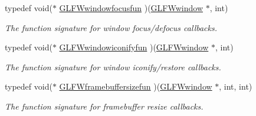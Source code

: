\begin{DoxyCompactItemize}
typedef void($\ast$ \hyperlink{group__window_ga6b5f973531ea91663ad707ba4f2ac104}{\-G\-L\-F\-Wwindowfocusfun} )(\hyperlink{group__window_ga3c96d80d363e67d13a41b5d1821f3242}{\-G\-L\-F\-Wwindow} $\ast$, int)
\begin{DoxyCompactList}\small\item\em \-The function signature for window focus/defocus callbacks. \end{DoxyCompactList}\item 
typedef void($\ast$ \hyperlink{group__window_gae47ae066eea9fe6050a62360928ae524}{\-G\-L\-F\-Wwindowiconifyfun} )(\hyperlink{group__window_ga3c96d80d363e67d13a41b5d1821f3242}{\-G\-L\-F\-Wwindow} $\ast$, int)
\begin{DoxyCompactList}\small\item\em \-The function signature for window iconify/restore callbacks. \end{DoxyCompactList}\item 
typedef void($\ast$ \hyperlink{group__window_ga311bb32e578aa240b6464af494debffc}{\-G\-L\-F\-Wframebuffersizefun} )(\hyperlink{group__window_ga3c96d80d363e67d13a41b5d1821f3242}{\-G\-L\-F\-Wwindow} $\ast$, int, int)
\begin{DoxyCompactList}\small\item\em \-The function signature for framebuffer resize callbacks. \end{DoxyCompactList}\end{DoxyCompactItemize}
